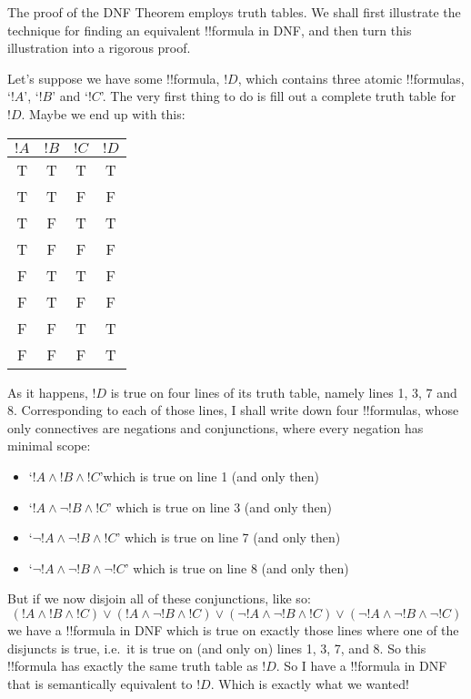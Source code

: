 \documentclass[../../../include/open-logic-section]{subfiles}
\begin{document}
The proof of the DNF Theorem employs truth tables. We shall first illustrate the technique for finding an equivalent !!{formula} in DNF, and then turn this illustration into a rigorous proof. 

Let's suppose we have some !!{formula}, ${!D}$, which contains three atomic !!{formula}s, `$!A$', `$!B$' and `$!C$'. The very first thing to do is fill out a complete truth table for ${!D}$. Maybe we end up with this:
\begin{center}
\begin{tabular}{c c c | c}
$!A$ & $!B$ & $!C$ & ${!D}$\\
\hline
 T & T & T & T \\
 T & T & F & F \\
 T & F & T & T \\
 T & F & F & F \\
 F & T & T & F \\
 F & T & F & F \\
 F & F & T & T \\
 F & F & F & T
\end{tabular}
\end{center}

As it happens, ${!D}$ is true on four lines of its truth table, namely lines 1, 3, 7 and 8. Corresponding to each of those lines, I shall write down four !!{formula}s, whose only connectives are negations and conjunctions, where every negation has minimal scope:
	\begin{itemize}
		\item[\textbullet]  `$!A \land !B \land !C$'\hfill which is true on line 1 (and only then)
		\item[\textbullet] `$!A \land \lnot !B \land !C$' \hfill which is true on line 3 (and only then)
		\item[\textbullet] `$\lnot !A \land \lnot !B \land !C$' \hfill which is true on line 7 (and only then)
		\item[\textbullet] `$\lnot !A \land \lnot !B \land \lnot !C$' \hfill which is true on line 8 (and only then)
	\end{itemize}

But if we now disjoin all of these conjunctions, like so:
$$(!A \land !B \land !C) \lor (!A \land \lnot !B \land !C) \lor (\lnot !A \land \lnot !B \land !C) \lor (\lnot !A \land \lnot !B \land \lnot !C)$$
we have a !!{formula} in DNF which is true on exactly those lines where one of the disjuncts is true, i.e.\ it is true on (and only on) lines 1, 3, 7, and 8. So this !!{formula} has exactly the same truth table as $!D$. So I have a !!{formula} in DNF that is semantically equivalent to $!D$. Which is exactly what we wanted!
\end{document}

